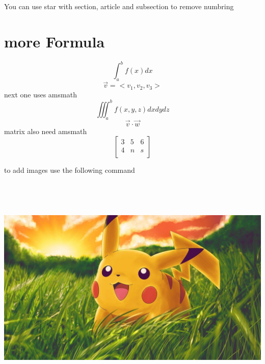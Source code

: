 \documentclass{article}
\begin{document}
\newpage
You can use star with section, article and subsection to remove numbring\\

\section*{more Formula}
$$\int_{a}^{b} f(x)dx$$
$$\vec{v} = <v_1, v_2, v_3>$$
next one uses amsmath 
$$\iiint_{a}^{b} f(x,y,z)dxdydz$$
$$\vec{v} \cdot \vec{w} $$
matrix also need amsmath
$$\begin{bmatrix}
    3 & 5 & 6\\
    4 & n & s\\
\end{bmatrix}$$

\newpage

to add images use the following command\\ \\ \\ \\ \\ 
\includegraphics[scale = 0.2]{w}
\end{document}
